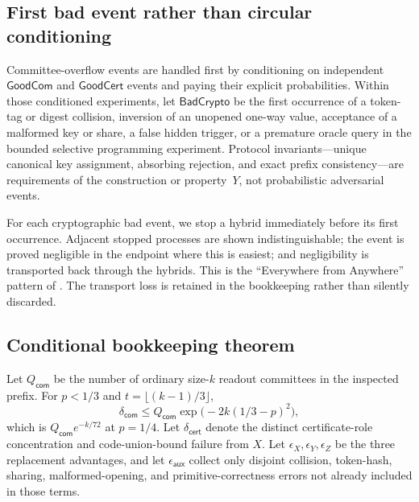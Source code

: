 \subsection{First bad event rather than circular conditioning}

Committee-overflow events are handled first by conditioning on independent
$\mathsf{GoodCom}$ and $\mathsf{GoodCert}$ events and paying their explicit
probabilities.  Within those conditioned experiments, let
$\mathsf{BadCrypto}$ be the first occurrence of a token-tag or digest
collision, inversion of an unopened one-way value, acceptance of a malformed
key or share, a false hidden trigger, or a premature oracle query in the
bounded selective programming experiment.  Protocol invariants---unique
canonical key assignment, absorbing rejection, and exact prefix
consistency---are requirements of the construction or property~$Y$, not
probabilistic adversarial events.

For each cryptographic bad event, we stop a hybrid immediately before its
first occurrence.  Adjacent stopped processes are shown indistinguishable;
the event is proved negligible in the endpoint where this is easiest; and
negligibility is transported back through the hybrids.  This is the
``Everywhere from Anywhere'' pattern of
\cite[Lemma~8]{DamgardEtAl2025AsyncYOSO}.  The transport loss is retained in
the bookkeeping rather than silently discarded.

\subsection{Conditional bookkeeping theorem}

Let $Q_{\mathsf{com}}$ be the number of ordinary size-$k$ readout committees
in the inspected prefix.  For $p<1/3$ and
$t=\lfloor(k-1)/3\rfloor$,
\[
  \delta_{\mathsf{com}}
  \leq Q_{\mathsf{com}}
       \exp\bigl(-2k(1/3-p)^2\bigr),
\]
which is $Q_{\mathsf{com}}e^{-k/72}$ at $p=1/4$.  Let
$\delta_{\mathsf{cert}}$ denote the distinct certificate-role concentration
and code-union-bound failure from $X$.  Let
$\epsilon_X,\epsilon_Y,\epsilon_Z$ be the three replacement advantages, and
let $\epsilon_{\mathsf{aux}}$ collect only disjoint collision, token-hash,
sharing, malformed-opening, and primitive-correctness errors not already
included in those terms.

